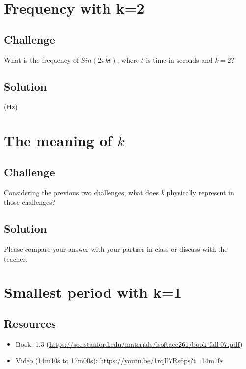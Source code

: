 



\newpage
\section{Frequency with k=2}

\subsection*{Challenge}
What is the frequency of $Sin(2 \pi k t)$, where $t$ is time in seconds and $k=2$?

\subsection*{Solution}
(Hz)





\newpage
\section{The meaning of $k$}

\subsection*{Challenge}
Considering the previous two challenges, what does $k$ physically represent in those challenges?

\subsection*{Solution}
Please compare your answer with your partner in class or discuss with the teacher.




\newpage
\section {Smallest period with k=1}

\subsection*{Resources}
\begin{itemize}
    \item Book: 1.3 (\url{https://see.stanford.edu/materials/lsoftaee261/book-fall-07.pdf})
    \item Video (14m10s to 17m00s): \url{https://youtu.be/1rqJl7Rs6ps?t=14m10s}
\end{itemize}

